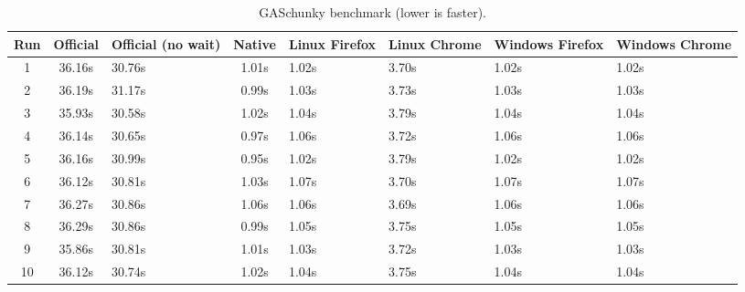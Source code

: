 \begin{table}[ht]
  \begin{center}
    \centering
    \begin{tabular}{c c p{1.5cm} c p{1.5cm} p{2cm} p{2cm} p{2cm}}
      \toprule
      Run & Official & Official (no wait) & Native & Linux Firefox & Linux Chrome  & Windows Firefox & Windows Chrome  \\
      \midrule
      1   &   36.16s &             30.76s &  1.01s & 1.02s         & 3.70s         & 1.02s           & 1.02s           \\
      2   &   36.19s &             31.17s &  0.99s & 1.03s         & 3.73s         & 1.03s           & 1.03s           \\
      3   &   35.93s &             30.58s &  1.02s & 1.04s         & 3.79s         & 1.04s           & 1.04s           \\
      4   &   36.14s &             30.65s &  0.97s & 1.06s         & 3.72s         & 1.06s           & 1.06s           \\
      5   &   36.16s &             30.99s &  0.95s & 1.02s         & 3.79s         & 1.02s           & 1.02s           \\
      6   &   36.12s &             30.81s &  1.03s & 1.07s         & 3.70s         & 1.07s           & 1.07s           \\
      7   &   36.27s &             30.86s &  1.06s & 1.06s         & 3.69s         & 1.06s           & 1.06s           \\
      8   &   36.29s &             30.86s &  0.99s & 1.05s         & 3.75s         & 1.05s           & 1.05s           \\
      9   &   35.86s &             30.81s &  1.01s & 1.03s         & 3.72s         & 1.03s           & 1.03s           \\
      10  &   36.12s &             30.74s &  1.02s & 1.04s         & 3.75s         & 1.04s           & 1.04s           \\
      \bottomrule
    \end{tabular}
    \caption{GASchunky benchmark (lower is faster).}%
    \label{table:gaschunky}
  \end{center}
\end{table}

